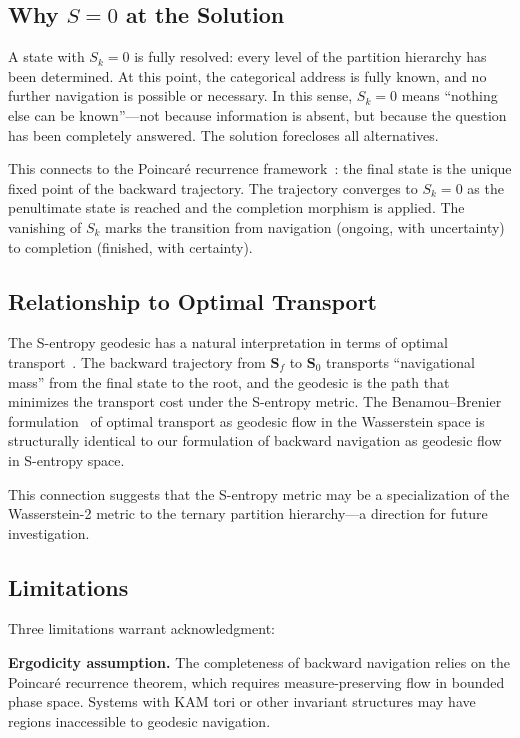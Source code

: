 \documentclass[12pt,twocolumn]{article}
\begin{document}
\subsection{Why $S = 0$ at the Solution}

A state with $S_k = 0$ is fully resolved: every level of the partition hierarchy has been determined. At this point, the categorical address is fully known, and no further navigation is possible or necessary. In this sense, $S_k = 0$ means ``nothing else can be known''---not because information is absent, but because the question has been completely answered. The solution forecloses all alternatives.

This connects to the Poincar\'{e} recurrence framework~\cite{poincare1890probleme}: the final state is the unique fixed point of the backward trajectory. The trajectory converges to $S_k = 0$ as the penultimate state is reached and the completion morphism is applied. The vanishing of $S_k$ marks the transition from navigation (ongoing, with uncertainty) to completion (finished, with certainty).

\subsection{Relationship to Optimal Transport}

The S-entropy geodesic has a natural interpretation in terms of optimal transport~\cite{villani2009optimal,kantorovich1942translocation}. The backward trajectory from $\mathbf{S}_f$ to $\mathbf{S}_0$ transports ``navigational mass'' from the final state to the root, and the geodesic is the path that minimizes the transport cost under the S-entropy metric. The Benamou--Brenier formulation~\cite{benamou2000computational} of optimal transport as geodesic flow in the Wasserstein space is structurally identical to our formulation of backward navigation as geodesic flow in S-entropy space.

This connection suggests that the S-entropy metric may be a specialization of the Wasserstein-2 metric to the ternary partition hierarchy---a direction for future investigation.

\subsection{Limitations}

Three limitations warrant acknowledgment:

\textbf{Ergodicity assumption.} The completeness of backward navigation relies on the Poincar\'{e} recurrence theorem, which requires measure-preserving flow in bounded phase space. Systems with KAM tori or other invariant structures may have regions inaccessible to geodesic navigation.
\end{document}

